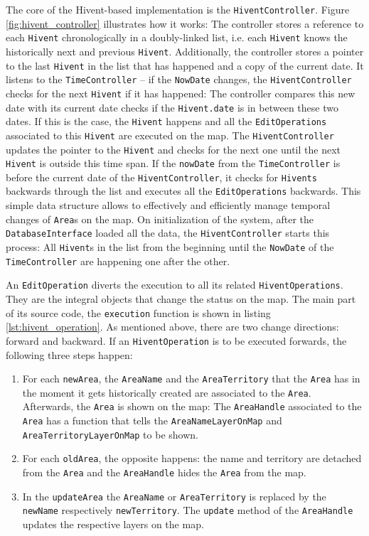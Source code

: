 The core of the Hivent-based implementation is the \texttt{HiventController}. Figure \ref{fig:hivent_controller} illustrates how it works: The controller stores a reference to each \texttt{Hivent} chronologically in a doubly-linked list, i.e. each \texttt{Hivent} knows the historically next and previous \texttt{Hivent}. Additionally, the controller stores a pointer to the last \texttt{Hivent} in the list that has happened and a copy of the current date. It listens to the \texttt{TimeController} -- if the \texttt{NowDate} changes, the \texttt{HiventController} checks for the next \texttt{Hivent} if it has happened: The controller compares this new date with its current date checks if the \texttt{Hivent.date} is in between these two dates. If this is the case, the \texttt{Hivent} happens and all the \texttt{EditOperations} associated to this \texttt{Hivent} are executed on the map. The \texttt{HiventController} updates the pointer to the \texttt{Hivent} and checks for the next one until the next \texttt{Hivent} is outside this time span. If the \texttt{nowDate} from the \texttt{TimeController} is before the current date of the \texttt{HiventController}, it checks for \texttt{Hivents} backwards through the list and executes all the \texttt{EditOperations} backwards. This simple data structure allows to effectively and efficiently manage temporal changes of \texttt{Area}s on the map. On initialization of the system, after the \texttt{DatabaseInterface} loaded all the data, the \texttt{HiventController} starts this process: All \texttt{Hivent}s in the list from the beginning until the \texttt{NowDate} of the \texttt{TimeController} are happening one after the other.

An \texttt{EditOperation} diverts the execution to all its related \texttt{HiventOperations}. They are the integral objects that change the status on the map. The main part of its source code, the \texttt{execution} function is shown in listing \ref{lst:hivent_operation}. As mentioned above, there are two change directions: forward and backward. If an \texttt{HiventOperation} is to be executed forwards, the following three steps happen:

\begin{enumerate}
  \item For each \texttt{newArea}, the \texttt{AreaName} and the \texttt{AreaTerritory} that the \texttt{Area} has in the moment it gets historically created are associated to the \texttt{Area}. Afterwards, the \texttt{Area} is shown on the map: The \texttt{AreaHandle} associated to the \texttt{Area} has a function that tells the \texttt{AreaNameLayerOnMap} and \texttt{AreaTerritoryLayerOnMap} to be shown.
  \item For each \texttt{oldArea}, the opposite happens: the name and territory are detached from the \texttt{Area} and the \texttt{AreaHandle} hides the \texttt{Area} from the map.
  \item In the \texttt{updateArea} the \texttt{AreaName} or \texttt{AreaTerritory} is replaced by the \texttt{newName} respectively \texttt{newTerritory}. The \texttt{update} method of the \texttt{AreaHandle} updates the respective layers on the map.
\end{enumerate}

